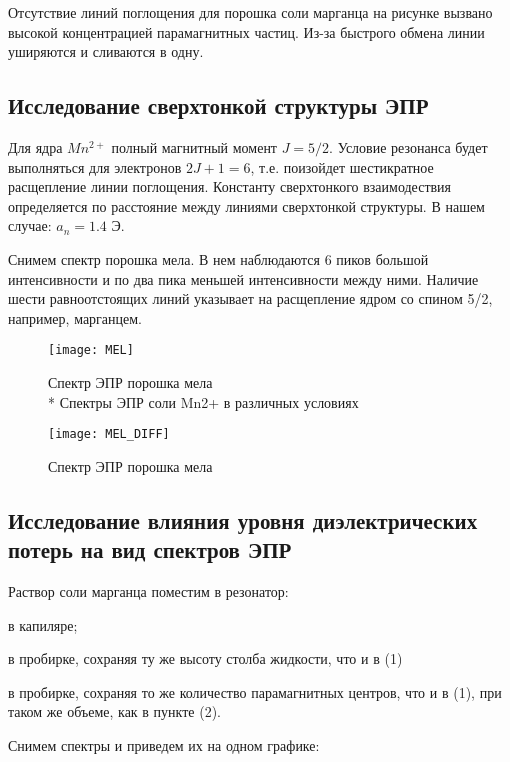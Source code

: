 \documentclass[a4paper,12pt]{article}
\begin{document}
	
	Отсутствие линий поглощения для порошка соли марганца на рисунке вызвано высокой концентрацией парамагнитных частиц. Из-за быстрого обмена линии уширяются и сливаются в одну.
	
	\subsection{Исследование сверхтонкой структуры ЭПР}
	
	 Для ядра $Mn^{2+}$ полный магнитный момент $J=5/2$. Условие резонанса будет выполняться для электронов $2J+1=6$, т.е. поизойдет шестикратное расщепление линии поглощения. Константу сверхтонкого взаимодествия определяется по расстояние между линиями сверхтонкой структуры. В нашем случае: $a_n = 1.4$ Э.
	 
	 Снимем спектр порошка мела. В нем наблюдаются 6 пиков большой интенсивности и по два пика меньшей интенсивности между ними. Наличие шести равноотстоящих линий указывает на расщепление ядром со спином 5/2, например, марганцем.
	 
	
	\begin{figure}[H]
		\begin{center}
			\texttt{[image: MEL]}
			\caption{Спектр ЭПР порошка мела\\* Спектры ЭПР соли Mn2+ в различных условиях}       
		\end{center}
	\end{figure}
	
	
 	\begin{figure}[H]
		\begin{center}
			\texttt{[image: MEL\_DIFF]}
			\caption{Спектр ЭПР порошка мела}
		\end{center}
	\end{figure}
	 
	 
	\subsection{Исследование влияния уровня диэлектрических потерь на вид спектров ЭПР}
	Раствор соли марганца поместим в резонатор:
	\begin{etaremune}
	\item в капиляре;
	\item в пробирке, сохраняя ту же высоту столба жидкости, что и в (1)
	\item в пробирке, сохраняя то же количество парамагнитных центров, что и в (1), при таком же объеме, как в пункте (2).
	\end{etaremune}
	Снимем спектры и приведем их на одном графике:
	
\end{document}
